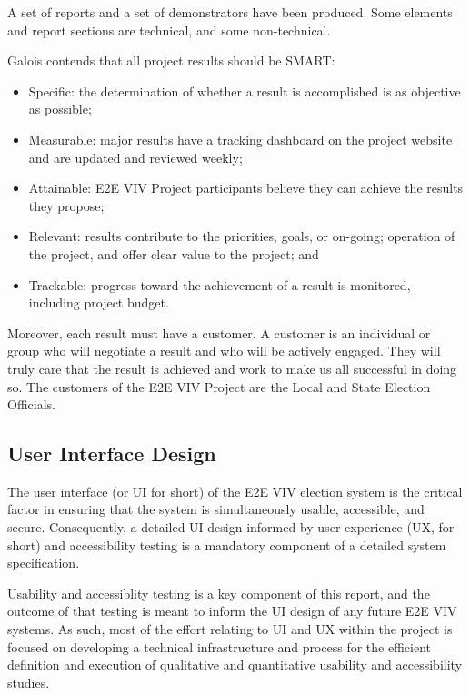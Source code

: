 A set of reports and a set of demonstrators have been produced. Some
elements and report sections are technical, and some non-technical.

Galois contends that all project results should be SMART:
\begin{itemize}
\item Specific: the determination of whether a result is accomplished
  is as objective as possible;
\item Measurable: major results have a tracking dashboard on the
  project website and are updated and reviewed weekly;
\item Attainable: E2E VIV Project participants believe they can
  achieve the results they propose;
\item Relevant: results contribute to the priorities, goals, or
  on-going; operation of the project, and offer clear value to the
  project; and
\item Trackable: progress toward the achievement of a result is
  monitored, including project budget.
\end{itemize}

Moreover, each result must have a customer. A customer is an
individual or group who will negotiate a result and who will be
actively engaged. They will truly care that the result is achieved and
work to make us all successful in doing so. The customers of the E2E
VIV Project are the Local and State Election Officials.

\subsection{User Interface Design}
\label{sec:user-interf-design}

The user interface (or UI for short) of the E2E VIV election system is
the critical factor in ensuring that the system is simultaneously
usable, accessible, and secure. Consequently, a detailed UI design
informed by user experience (UX, for short) and accessibility testing
is a mandatory component of a detailed system specification.

Usability and accessiblity testing is a key component of this report,
and the outcome of that testing is meant to inform the UI design of
any future E2E VIV systems. As such, most of the effort relating to
UI and UX within the project is focused on developing a technical
infrastructure and process for the efficient definition and execution
of qualitative and quantitative usability and accessibility studies.

